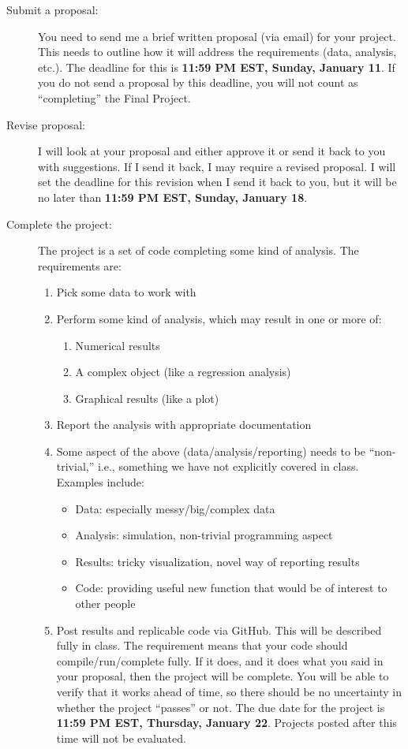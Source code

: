 \documentclass{tufte-handout}
\begin{document}
\begin{description}
\item[Submit a proposal:] You need to send me a brief written proposal (via email) for your project. This needs to outline how it will address the requirements (data, analysis, etc.). The deadline for this is \textbf{11:59 PM EST, Sunday, January 11}. If you do not send a proposal by this deadline, you will not count as ``completing'' the Final Project.
\item[Revise proposal:] I will look at your proposal and either approve it or send it back to you with suggestions. If I send it back, I may require a revised proposal. I will set the deadline for this revision when I send it back to you, but it will be no later than \textbf{11:59 PM EST, Sunday, January 18}.
\item[Complete the project:] The project is a set of code completing some kind of analysis. The requirements are:
\begin{enumerate}
\item Pick some data to work with
\item Perform some kind of analysis, which may result in one or more of:
\begin{enumerate}
\item Numerical results
\item A complex object (like a regression analysis)
\item Graphical results (like a plot)
\end{enumerate}
\item Report the analysis with appropriate documentation
\item Some aspect of the above (data/analysis/reporting) needs to be ``non-trivial,'' i.e., something we have not explicitly covered in class.  Examples include:
\begin{itemize}
\item Data: especially messy/big/complex data
\item Analysis: simulation, non-trivial programming aspect
\item Results: tricky visualization, novel way of reporting results
\item Code: providing useful new function that would be of interest to other people
\end{itemize}
\item Post results and replicable code via GitHub. This will be described fully in class. The requirement means that your code should compile/run/complete fully. If it does, and it does what you said in your proposal, then the project will be complete.  You will be able to verify that it works ahead of time, so there should be no uncertainty in whether the project ``passes'' or not. The due date for the project is \textbf{11:59 PM EST, Thursday, January 22}. Projects posted after this time will not be evaluated.
\end{enumerate}
\end{description}
\end{document}
